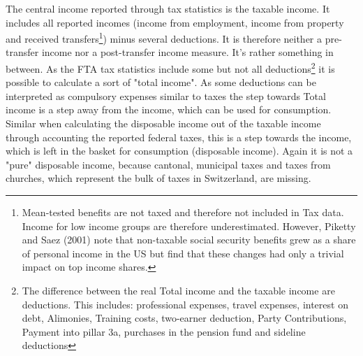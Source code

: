 \documentclass[twoside]{article}\usepackage[]{graphicx}\usepackage[]{color}
\begin{document}
\begin{multicols}{2}



The central income reported through tax statistics is the taxable income. It includes all reported incomes (income from employment, income from property and received transfers\footnote{ Mean-tested benefits are not taxed and therefore not included in Tax data. Income for low income groups are therefore underestimated. However, Piketty and Saez (2001) note that non-taxable social security benefits grew as a share of personal income in the US but find that these changes had only a trivial impact on top income shares.}) minus several deductions. It is therefore neither a pre-transfer income  nor a post-transfer income measure. It's rather something in between. As the FTA tax statistics include some but not all deductions\footnote{The difference between the real Total income and the taxable income are deductions. This includes: professional expenses, travel expenses, interest on debt, Alimonies, Training costs, two-earner deduction, Party Contributions, Payment into pillar 3a, purchases in the pension fund and sideline deductions} it is possible to calculate a sort of "total income". As some deductions can be interpreted as compulsory expenses similar to taxes the step towards Total income is a step away from the income, which can be used for consumption. Similar when calculating the disposable income out of the taxable income through accounting the reported federal taxes, this is a step towards the income, which is left in the basket for consumption (disposable income). Again it is not a "pure" disposable income, because cantonal, municipal taxes and taxes from churches, which represent the bulk of taxes in Switzerland, are missing.   \\   



\end{multicols}
\end{document}
